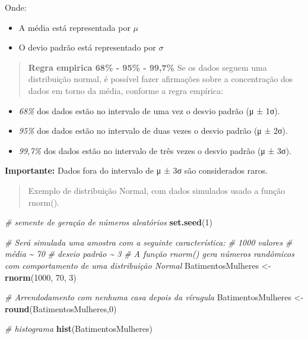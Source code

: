 \documentclass[
]{book}
\newenvironment{Shaded}{\begin{snugshade}}{\end{snugshade}}
\newcommand{\CommentTok}[1]{\textcolor[rgb]{0.56,0.35,0.01}{\textit{#1}}}
\newcommand{\DecValTok}[1]{\textcolor[rgb]{0.00,0.00,0.81}{#1}}
\newcommand{\FunctionTok}[1]{\textcolor[rgb]{0.13,0.29,0.53}{\textbf{#1}}}
\newcommand{\NormalTok}[1]{#1}
\newcommand{\OtherTok}[1]{\textcolor[rgb]{0.56,0.35,0.01}{#1}}
\providecommand{\tightlist}{%
  \setlength{\itemsep}{0pt}\setlength{\parskip}{0pt}}
\begin{document}
Onde:

\begin{itemize}
\tightlist
\item
  A média está representada por \(\mu\)
\item
  O devio padrão está representado por \(\sigma\)
\end{itemize}

\begin{quote}
\textbf{Regra empirica 68\% - 95\% - 99,7\%}
Se os dados seguem uma distribuição normal, é possível fazer afirmações sobre a concentração dos dados em torno da média, conforme a regra empírica:
\end{quote}

\begin{itemize}
\tightlist
\item
  \emph{68\%} dos dados estão no intervalo de uma vez o desvio padrão (μ ± 1σ).
\item
  \emph{95\%} dos dados estão no intervalo de duas vezes o desvio padrão (μ ± 2σ).
\item
  \emph{99,7\%} dos dados estão no intervalo de três vezes o desvio padrão (μ ± 3σ).
\end{itemize}

\textbf{Importante:} Dados fora do intervalo de μ ± 3σ são considerados raros.

\begin{quote}
Exemplo de distribuição Normal, com dados simulados usado a função rnorm().
\end{quote}

\begin{Shaded}
\begin{Highlighting}[]
\CommentTok{\# semente de geração de números aleatórios }
\FunctionTok{set.seed}\NormalTok{(}\DecValTok{1}\NormalTok{)}

\CommentTok{\# Será simulada uma amostra com a seguinte característica:}
\CommentTok{\# 1000 valores}
\CommentTok{\# média \textasciitilde{} 70}
\CommentTok{\# desvio padrão \textasciitilde{} 3}
\CommentTok{\# A função rnorm() gera números randômicos com comportamento de uma distribuição Normal }
\NormalTok{BatimentosMulheres }\OtherTok{\textless{}{-}} \FunctionTok{rnorm}\NormalTok{(}\DecValTok{1000}\NormalTok{, }\DecValTok{70}\NormalTok{, }\DecValTok{3}\NormalTok{)}

\CommentTok{\# Arrendodamento com nenhuma casa depois da vírugula}
\NormalTok{BatimentosMulheres }\OtherTok{\textless{}{-}} \FunctionTok{round}\NormalTok{(BatimentosMulheres,}\DecValTok{0}\NormalTok{)}

\CommentTok{\# histograma}
\FunctionTok{hist}\NormalTok{(BatimentosMulheres)}
\end{Highlighting}
\end{Shaded}
\end{document}
